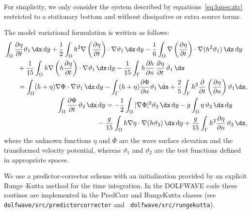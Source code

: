 For simplicity, we only consider the system described by
equations~\eqref{eq:lopes:ztc} restricted to a stationary
bottom and without dissipative
or extra source terms.

The model variational formulation is written as follows:
\begin{subequations}\label{eq:lopes:varform}
\begin{align}
\begin{split}
&\displaystyle \int_\Omega\frac{\partial \eta}{\partial t}\vartheta_1\, \dx\, \mathrm{d}y
  +\frac{1}{2}\int_\Omega
  h^2\nabla\left(\frac{\partial \eta}{\partial t}\right)\cdot\nabla\vartheta_1\,
  \dx\, \mathrm{d}y- \frac{1}{6}\int_\Omega \nabla\left(
  \frac{\partial \eta}{\partial t}\right)\cdot\nabla(h^2\vartheta_1)\,
  \dx\, \mathrm{d}y\\
 &\quad \quad\displaystyle +
  \frac{1}{15}\int_\Omega
  h\nabla\left(h\frac{\partial \eta}{\partial t}\right)\cdot
  \nabla\vartheta_1\, \dx\, \mathrm{d}y- \frac{1}{15}\int_\Gamma
  h\frac{\partial h}{\partial n}\,\frac{\partial \eta}{\partial t}\,\vartheta_1\, \ds
  \\ &\quad\quad=\displaystyle
  \int_\Omega(h+\eta)\nabla\Phi\cdot\nabla\vartheta_1\,
  \dx\, \mathrm{d}y -\int_\Gamma(h+\eta)\frac{\partial \Phi}{\partial n}\vartheta_1\, \ds
  +\frac{2}{5}\int_\Gamma
  h^2\frac{\partial }{\partial t}\left(\frac{\partial \eta}{\partial n}\right)\vartheta_1 \ds,
\vspace{0.3cm}
\end{split} \\
\begin{split}
&\displaystyle \int_\Omega \frac{\partial \Phi}{\partial t}\,\vartheta_2\,
  \dx\, \mathrm{d}y= -\frac{1}{2}\int_\Omega|\nabla\Phi|^2\vartheta_2\,
  \dx\, \mathrm{d}y -g\int_\Omega \eta\,\vartheta_2\,
  \dx\, \mathrm{d}y\\
&\qquad\qquad\qquad\displaystyle-\frac{g}{15}\int_\Omega
  h\nabla\eta\cdot\nabla(h\vartheta_2)\, \dx\, \mathrm{d}y
  +\frac{g}{15}\int_\Gamma h^2\frac{\partial \eta}{\partial n}\,\vartheta_2\,
  \ds,
\end{split}
\end{align}
\end{subequations}
where the unknown functions $\eta$ and $\Phi$ are the wave
surface elevation and the transformed velocity potential,
whereas $\vartheta_1$ and $\vartheta_2$ are the test
functions defined in appropriate spaces.

We use a predictor-corrector 
scheme with an initialization provided by an explicit
Runge--Kutta method for the time
integration. In the DOLFWAVE code these routines are
implemented in the PredCorr and RungeKutta classes (see {\tt
  dolfwave/src/predictorcorrector} and {\tt
  dolfwave/src/rungekutta}).

